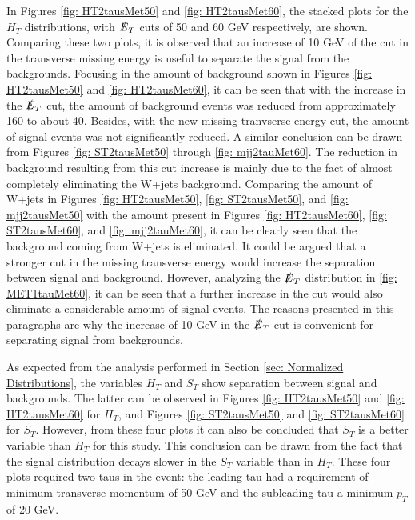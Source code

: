In Figures \ref{fig: HT2tausMet50} and \ref{fig: HT2tausMet60}, the stacked plots for the $H_{T}$ distributions, with $\slashed{E}_{T}$ cuts of 50 and 60 GeV respectively, are shown. Comparing these two plots, it is observed that an increase of 10 GeV of the cut in the transverse missing energy is useful to separate the signal from the backgrounds. Focusing in the amount of background shown in Figures \ref{fig: HT2tausMet50} and \ref{fig: HT2tausMet60}, it can be seen that with the increase in the $\slashed{E}_{T}$ cut, the amount of background events was reduced from approximately 160 to about 40. Besides, with the new missing tranvserse energy cut, the amount of signal events was not significantly reduced. A similar conclusion can be drawn from Figures \ref{fig: ST2tausMet50} through \ref{fig: mjj2tauMet60}. The reduction in background resulting from this cut increase is mainly due to the fact of almost completely eliminating the W+jets background. Comparing the amount of W+jets in Figures \ref{fig: HT2tausMet50}, \ref{fig: ST2tausMet50}, and \ref{fig: mjj2tausMet50} with the amount present in Figures \ref{fig: HT2tausMet60}, \ref{fig: ST2tausMet60}, and \ref{fig: mjj2tauMet60}, it can be clearly seen that the background coming from W+jets is eliminated. It could be argued that a stronger cut in the missing transverse energy would increase the separation between signal and background. However, analyzing the $\slashed{E}_{T}$ distribution in \ref{fig: MET1tauMet60}, it can be seen that a further increase in the cut would also eliminate a considerable amount of signal events. The reasons presented in this paragraphs are why the increase of 10 GeV in the $\slashed{E}_{T}$ cut is convenient for separating signal from backgrounds.

As expected from the analysis performed in Section \ref{sec: Normalized Distributions}, the variables $H_{T}$ and $S_{T}$ show separation between signal and backgrounds. The latter can be observed in Figures \ref{fig: HT2tausMet50} and \ref{fig: HT2tausMet60} for $H_{T}$, and Figures \ref{fig: ST2tausMet50} and \ref{fig: ST2tausMet60} for $S_{T}$. However, from these four plots it can also be concluded that $S_{T}$ is a better variable than $H_{T}$ for this study. This conclusion can be drawn from the fact that the signal distribution decays slower in the $S_{T}$ variable than in $H_{T}$. These four plots required two taus in the event: the leading tau had a requirement of minimum transverse momentum of 50 GeV and the subleading tau a minimum $p_{T}$ of 20 GeV.

